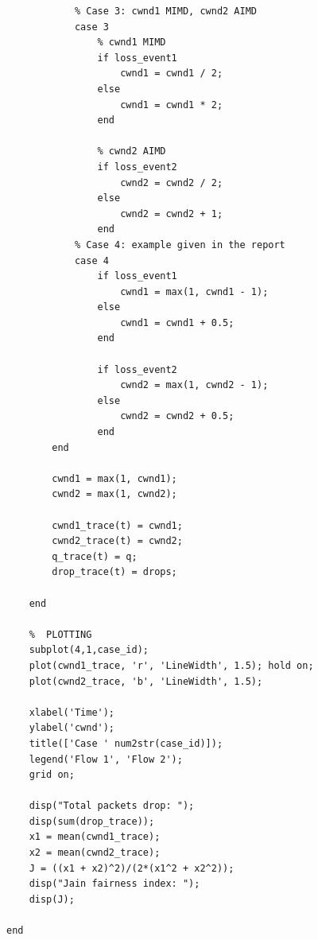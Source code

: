 \documentclass[a4paper,12pt]{article}
\begin{document}
\begin{lstlisting}
            % Case 3: cwnd1 MIMD, cwnd2 AIMD
            case 3
                % cwnd1 MIMD
                if loss_event1
                    cwnd1 = cwnd1 / 2;
                else
                    cwnd1 = cwnd1 * 2;
                end

                % cwnd2 AIMD
                if loss_event2
                    cwnd2 = cwnd2 / 2;
                else
                    cwnd2 = cwnd2 + 1;
                end
            % Case 4: example given in the report
            case 4
                if loss_event1
                    cwnd1 = max(1, cwnd1 - 1); 
                else
                    cwnd1 = cwnd1 + 0.5; 
                end
            
                if loss_event2
                    cwnd2 = max(1, cwnd2 - 1);
                else
                    cwnd2 = cwnd2 + 0.5;
                end
        end

        cwnd1 = max(1, cwnd1);
        cwnd2 = max(1, cwnd2);

        cwnd1_trace(t) = cwnd1;
        cwnd2_trace(t) = cwnd2;
        q_trace(t) = q;
        drop_trace(t) = drops;

    end

    %  PLOTTING 
    subplot(4,1,case_id);
    plot(cwnd1_trace, 'r', 'LineWidth', 1.5); hold on;
    plot(cwnd2_trace, 'b', 'LineWidth', 1.5);

    xlabel('Time');
    ylabel('cwnd');
    title(['Case ' num2str(case_id)]);
    legend('Flow 1', 'Flow 2');
    grid on;

    disp("Total packets drop: ");
    disp(sum(drop_trace));
    x1 = mean(cwnd1_trace);
    x2 = mean(cwnd2_trace);
    J = ((x1 + x2)^2)/(2*(x1^2 + x2^2));
    disp("Jain fairness index: ");
    disp(J);

end
\end{lstlisting}
\end{document}
